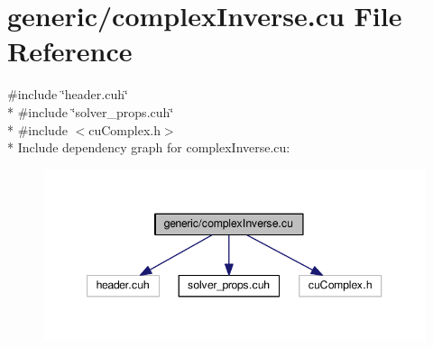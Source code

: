 \hypertarget{complexInverse_8cu}{}\section{generic/complex\+Inverse.cu File Reference}
\label{complexInverse_8cu}
{\ttfamily \#include \char`\"{}header.\+cuh\char`\"{}}\\*
{\ttfamily \#include \char`\"{}solver\+\_\+props.\+cuh\char`\"{}}\\*
{\ttfamily \#include $<$cu\+Complex.\+h$>$}\\*
Include dependency graph for complex\+Inverse.\+cu\+:\nopagebreak
\begin{figure}[H]
\begin{center}
\leavevmode
\includegraphics[width=347pt]{complexInverse_8cu__incl}
\end{center}
\end{figure}
